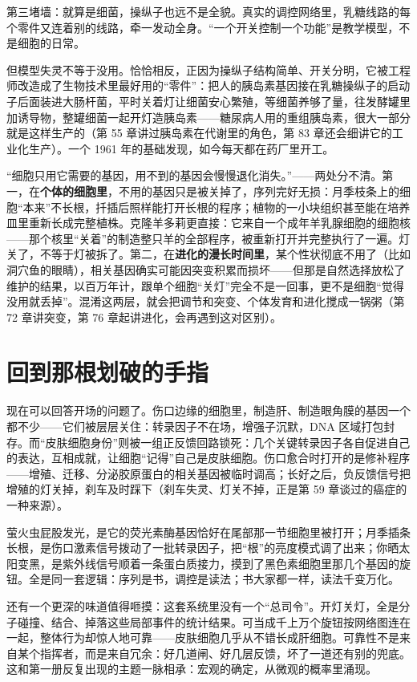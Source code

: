 第三堵墙：就算是细菌，操纵子也远不是全貌。真实的调控网络里，乳糖线路的每个零件又连着别的线路，牵一发动全身。“一个开关控制一个功能”是教学模型，不是细胞的日常。

但模型失灵不等于没用。恰恰相反，正因为操纵子结构简单、开关分明，它被工程师改造成了生物技术里最好用的“零件”：把人的胰岛素基因接在乳糖操纵子的启动子后面装进大肠杆菌，平时关着灯让细菌安心繁殖，等细菌养够了量，往发酵罐里加诱导物，整罐细菌一起开灯造胰岛素——糖尿病人用的重组胰岛素，很大一部分就是这样生产的（第 55 章讲过胰岛素在代谢里的角色，第 83 章还会细讲它的工业化生产）。一个 1961 年的基础发现，如今每天都在药厂里开工。

\begin{wuqu}
“细胞只用它需要的基因，用不到的基因会慢慢退化消失。”——两处分不清。第一，在\textbf{个体的细胞里}，不用的基因只是被关掉了，序列完好无损：月季枝条上的细胞“本来”不长根，扦插后照样能打开长根的程序；植物的一小块组织甚至能在培养皿里重新长成完整植株。克隆羊多莉更直接：它来自一个成年羊乳腺细胞的细胞核——那个核里“关着”的制造整只羊的全部程序，被重新打开并完整执行了一遍。灯关了，不等于灯被拆了。第二，在\textbf{进化的漫长时间里}，某个性状彻底不用了（比如洞穴鱼的眼睛），相关基因确实可能因突变积累而损坏——但那是自然选择放松了维护的结果，以百万年计，跟单个细胞“关灯”完全不是一回事，更不是细胞“觉得没用就丢掉”。混淆这两层，就会把调节和突变、个体发育和进化搅成一锅粥（第 72 章讲突变，第 76 章起讲进化，会再遇到这对区别）。
\end{wuqu}

\section{回到那根划破的手指}

现在可以回答开场的问题了。伤口边缘的细胞里，制造肝、制造眼角膜的基因一个都不少——它们被层层关住：转录因子不在场，增强子沉默，DNA 区域打包封存。而“皮肤细胞身份”则被一组正反馈回路锁死：几个关键转录因子各自促进自己的表达，互相成就，让细胞“记得”自己是皮肤细胞。伤口愈合时打开的是修补程序——增殖、迁移、分泌胶原蛋白的相关基因被临时调高；长好之后，负反馈信号把增殖的灯关掉，刹车及时踩下（刹车失灵、灯关不掉，正是第 59 章谈过的癌症的一种来源）。

萤火虫屁股发光，是它的荧光素酶基因恰好在尾部那一节细胞里被打开；月季插条长根，是伤口激素信号拨动了一批转录因子，把“根”的亮度模式调了出来；你晒太阳变黑，是紫外线信号顺着一条蛋白质接力，摸到了黑色素细胞里那几个基因的旋钮。全是同一套逻辑：序列是书，调控是读法；书大家都一样，读法千变万化。

还有一个更深的味道值得咂摸：这套系统里没有一个“总司令”。开灯关灯，全是分子碰撞、结合、掉落这些局部事件的统计结果。可当成千上万个旋钮按网络图连在一起，整体行为却惊人地可靠——皮肤细胞几乎从不错长成肝细胞。可靠性不是来自某个指挥者，而是来自冗余：好几道闸、好几层反馈，坏了一道还有别的兜底。这和第一册反复出现的主题一脉相承：宏观的确定，从微观的概率里涌现。

